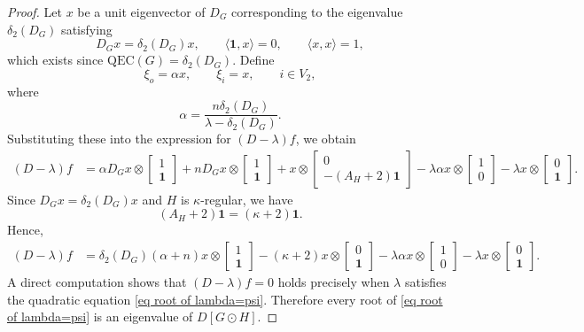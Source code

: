 \documentclass[10pt,a4paper]{amsart}
\begin{document}
\begin{proof}
Let $x$ be a unit eigenvector of $D_G$ corresponding to the eigenvalue
$\delta_2(D_G)$ satisfying
\[
D_Gx=\delta_2(D_G)x,
\qquad
\langle \mathbf1,x\rangle=0,
\qquad
\langle x,x\rangle=1,
\]
which exists since $\mathrm{QEC}(G)=\delta_2(D_G)$. Define
\[
\xi_o=\alpha x, \qquad \xi_i=x, \qquad i\in V_2,
\]
where
\[
\alpha=\frac{n\delta_2(D_G)}{\lambda-\delta_2(D_G)}.
\]
Substituting these into the expression for $(D-\lambda)f$, we obtain
\begin{align*}
(D-\lambda)f
&=\alpha D_Gx\otimes 
\begin{bmatrix}1\\\mathbf1\end{bmatrix}
+nD_Gx\otimes 
\begin{bmatrix}1\\\mathbf1\end{bmatrix}
+x\otimes 
\begin{bmatrix}0\\-(A_H+2)\mathbf1\end{bmatrix}
-\lambda\alpha x\otimes 
\begin{bmatrix}1\\0\end{bmatrix}
-\lambda x\otimes 
\begin{bmatrix}0\\\mathbf1\end{bmatrix}.
\end{align*}
Since $D_Gx=\delta_2(D_G)x$ and $H$ is $\kappa$-regular, we have
\[(A_H+2)\mathbf1=(\kappa+2)\mathbf1.\]
Hence,
\begin{align*}
(D-\lambda)f
&=\delta_2(D_G)(\alpha+n)x\otimes
\begin{bmatrix}1\\\mathbf1\end{bmatrix}
-(\kappa+2)x\otimes
\begin{bmatrix}0\\\mathbf1\end{bmatrix}-\lambda\alpha x\otimes
\begin{bmatrix}1\\0\end{bmatrix}
-\lambda x\otimes
\begin{bmatrix}0\\\mathbf1\end{bmatrix}.
\end{align*}
A direct computation shows that $(D-\lambda)f=0$ holds precisely when
$\lambda$ satisfies the quadratic equation \eqref{eq root of lambda=psi}.
Therefore every root of \eqref{eq root of lambda=psi} is an eigenvalue of
$D[G\odot H]$.


\end{proof}
\end{document}
